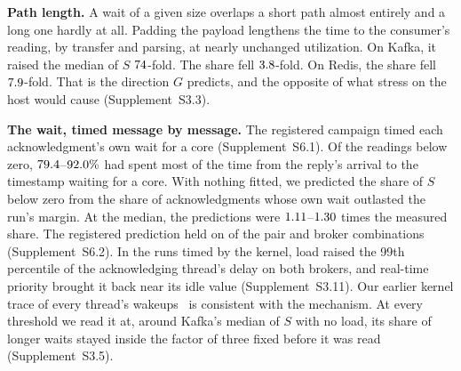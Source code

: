 \documentclass[10pt,journal,compsoc]{IEEEtran}
\newcommand{\kafka}{Kafka}
\newcommand{\redis}{Redis}
\begin{document}
\textbf{Path length.} A wait of a given size overlaps a short path almost entirely and a long one
hardly at all. Padding the payload lengthens the time to the consumer's reading, by transfer and
parsing, at nearly unchanged utilization. On \kafka{}, it raised the median of $S$
$74$-fold. The share
fell $3.8$-fold. On \redis{}, the share fell $7.9$-fold. That is the
direction $G$ predicts, and the opposite of what stress on the host would cause (Supplement~S3.3).

\textbf{The wait, timed message by message.} The registered campaign timed each acknowledgment's
own wait for a core (Supplement~S6.1). Of the
readings below zero, $79.4$--$92.0\%$ had spent most of the time from
the reply's arrival to the timestamp waiting for a core. With nothing fitted, we predicted the
share of $S$ below zero from the share of acknowledgments whose own wait outlasted the run's
margin. At the median, the predictions were $1.11$--$1.30$ times the
measured share. The registered prediction held on
\recOwnWaitPartsInWord{} of the \recOwnWaitPartsWord{} pair and broker combinations
(Supplement~S6.2). In the runs timed by the kernel, load raised the 99th percentile of the acknowledging thread's delay on both brokers, and real-time priority brought it back near its idle value (Supplement~S3.11). Our
earlier kernel trace of every thread's wakeups~\cite{gregg2016runqlat} is consistent with the
mechanism. At every threshold we read it at, around \kafka{}'s median of $S$ with no load, its share of longer waits stayed inside the factor of three fixed before it was read (Supplement~S3.5).
\end{document}
